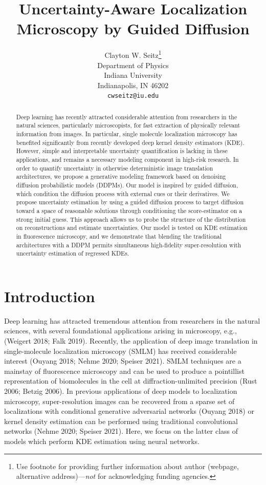 \documentclass{article}
\title{Uncertainty-Aware Localization Microscopy by Guided Diffusion}
\author{%
  Clayton W. Seitz\thanks{Use footnote for providing further information
    about author (webpage, alternative address)---\emph{not} for acknowledging
    funding agencies.} \\
  Department of Physics\\
  Indiana University\\
  Indianapolis, IN 46202 \\
  \texttt{cwseitz@iu.edu} \\
}
\begin{document}
\maketitle


\begin{abstract}

Deep learning has recently attracted considerable attention from researchers in the natural sciences, particularly microscopists, for fast extraction of physically relevant information from images. In particular, single molecule localization microscopy has benefited significantly from recently developed deep kernel density estimators (KDE). However, simple and interpretable uncertainty quantification is lacking in these applications, and remains a necessary modeling component in high-risk research. In order to quantify uncertainty in otherwise deterministic image translation architectures, we propose a generative modeling framework based on denoising diffusion probabilistic models (DDPMs). Our model is inspired by guided diffusion, which condition the diffusion process with external cues or their derivatives. We propose uncertainty estimation by using a guided diffusion process to target diffusion toward a space of reasonable solutions through conditioning the score-estimator on a strong initial guess. This approach allows us to probe the structure of the distribution on reconstructions and estimate uncertainties. Our model is tested on KDE estimation in fluorescence microscopy, and we demonstrate that blending the traditional architectures with a DDPM permits simultaneous high-fidelity super-resolution with uncertainty estimation of regressed KDEs. 
\end{abstract}

\section{Introduction}

Deep learning has attracted tremendous attention from researchers in the natural sciences, with several foundational applications arising in microscopy, e.g., (Weigert 2018; Falk 2019). Recently, the application of deep image translation in single-molecule localization microscopy (SMLM) has received considerable interest (Ouyang 2018; Nehme 2020; Speiser 2021). SMLM techniques are a mainstay of fluorescence microscopy and can be used to produce a pointillist representation of biomolecules in the cell at diffraction-unlimited precision (Rust 2006; Betzig 2006). In previous applications of deep models to localization microscopy, super-resolution images can be recovered from a sparse set of localizations with conditional generative adversarial networks (Ouyang 2018) or kernel density estimation can be performed using traditional convolutional networks (Nehme 2020; Speiser 2021). Here, we focus on the latter class of models which perform KDE estimation using neural networks. 
\end{document}
